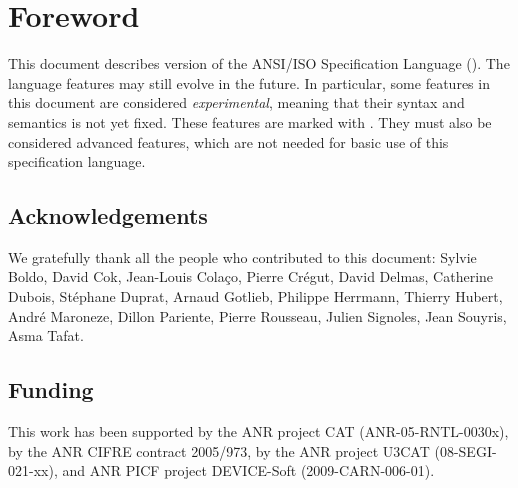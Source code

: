 \chapter*{Foreword}
\thispagestyle{plain}

This document describes version \version{} of the ANSI/ISO \lang
Specification Language (\NAME).
The language features may still evolve in the future.
In particular, some features in this document
are considered \emph{experimental}, meaning that their syntax and
semantics is not yet fixed.
These features are marked with
\experimental.
They must also be considered advanced features,
which are not needed for basic use of this
specification language.

\section*{Acknowledgements}

We gratefully thank all the people who contributed to this document:
Sylvie Boldo,
David Cok,
Jean-Louis Cola\c{c}o,
Pierre Cr\'egut,
David Delmas,
Catherine Dubois,
St\'ephane Duprat,
Arnaud Gotlieb,
Philippe Herrmann,
Thierry Hubert,
Andr\'e Maroneze,
Dillon Pariente,
Pierre Rousseau,
Julien Signoles,
Jean Souyris,
Asma Tafat.

\section*{Funding}

This work has been supported by the ANR project CAT
(ANR-05-RNTL-0030x), by the ANR CIFRE contract 2005/973, by the ANR project
U3CAT (08-SEGI-021-xx), and ANR PICF project DEVICE-Soft (2009-CARN-006-01).
